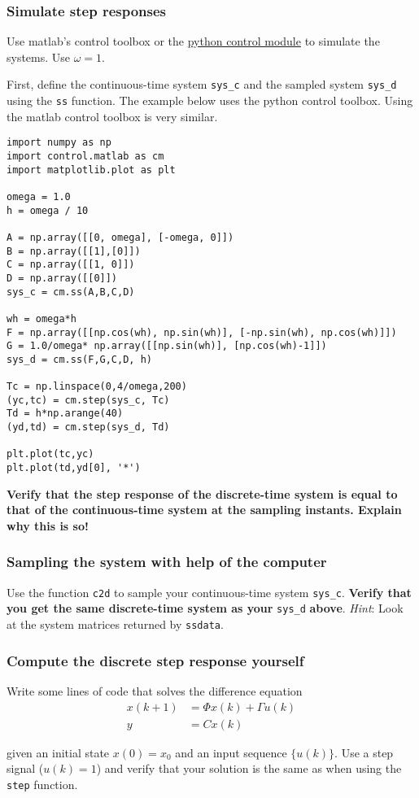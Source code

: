 \documentclass{scrartcl}
\begin{document}
\subsubsection{Simulate step responses}
\label{sec-1-2-1}

Use matlab's control toolbox or the \href{http://python-control.sourceforge.net/}{python control module}  to simulate the systems. Use $\omega=1$. 

First, define the continuous-time system \texttt{sys\_c} and the sampled system \texttt{sys\_d} using the \texttt{ss} function. The example below uses the python control toolbox. Using the matlab control toolbox is very similar.

\begin{verbatim}
import numpy as np
import control.matlab as cm
import matplotlib.plot as plt

omega = 1.0
h = omega / 10

A = np.array([[0, omega], [-omega, 0]])
B = np.array([[1],[0]])
C = np.array([[1, 0]])
D = np.array([[0]])
sys_c = cm.ss(A,B,C,D)

wh = omega*h
F = np.array([[np.cos(wh), np.sin(wh)], [-np.sin(wh), np.cos(wh)]])
G = 1.0/omega* np.array([[np.sin(wh)], [np.cos(wh)-1]])
sys_d = cm.ss(F,G,C,D, h)

Tc = np.linspace(0,4/omega,200)
(yc,tc) = cm.step(sys_c, Tc)
Td = h*np.arange(40)
(yd,td) = cm.step(sys_d, Td)

plt.plot(tc,yc)
plt.plot(td,yd[0], '*')
\end{verbatim}

\textbf{Verify that the step response of the discrete-time system is equal to that of the continuous-time system at the sampling instants. Explain why this is so!}
\subsubsection{Sampling the system with help of the computer}
\label{sec-1-2-2}

Use the function \texttt{c2d} to sample your continuous-time system \texttt{sys\_c}. \textbf{Verify that you get the same discrete-time system as your} \texttt{sys\_d} \textbf{above}. \emph{Hint}: Look at the system matrices returned by \texttt{ssdata}. 
\subsubsection{Compute the discrete step response yourself}
\label{sec-1-2-3}

    Write some lines of code that solves the difference equation
    \begin{align*}
    x(k+1) &= \Phi x(k) + \Gamma u(k)\\
    y &= Cx(k)
    \end{align*}

given an initial state $x(0)=x_0$ and an input sequence $\{u(k)\}$. Use a step signal ($u(k)=1$) and verify that your solution is the same as when using the \texttt{step} function.
 
\end{document}
